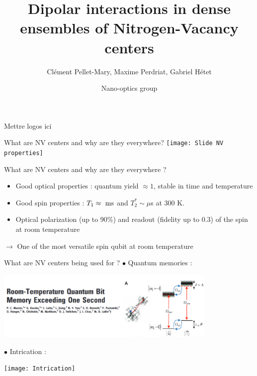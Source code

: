 \documentclass{beamer}
\title{Dipolar interactions in dense ensembles of Nitrogen-Vacancy centers}
\author{Clément Pellet-Mary, Maxime Perdriat, Gabriel Hétet}
\date{Nano-optics group}
\begin{document}
\begin{frame}
\maketitle
\centering
Mettre logos ici
\end{frame}
\begin{frame}{What are NV centers and why are they everywhere?}
\centering
\texttt{[image: Slide  NV properties]}
\end{frame}


\begin{frame}{What are NV centers and why are they everywhere ?}
\begin{itemize}
\item Good optical properties : quantum yield $\approx 1$, stable in time and temperature
\medskip
\item Good spin properties : $T_1\approx\ \rm ms$ and $T_2^*\sim \mu$s at 300 K.
\medskip
\item Optical polarization (up to 90\%) and readout (fidelity up to 0.3) of the spin at room temperature
\end{itemize}
\bigskip
$\to$ One of the most versatile spin qubit at room temperature
\end{frame}

\begin{frame}{What are NV centers being used for ?}
$\bullet$ Quantum memories :
\begin{center}
\includegraphics[width=0.8\textwidth,height=0.9\textheight,keepaspectratio]{mémoire}
\end{center}


$\bullet$ Intrication :
\begin{center}
\texttt{[image: Intrication]}
\end{center}
\end{frame}
\end{document}
